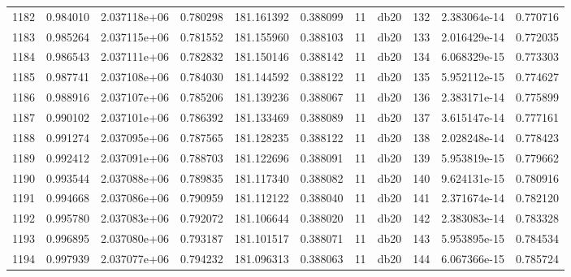 \begin{tabular}{lrrrrrrlrrr}
1182 &    0.984010 &        2.037118e+06 &  0.780298 &              181.161392 &    0.388099 &      11 &         db20 &    132 &   2.383064e-14 &      0.770716 \\
1183 &    0.985264 &        2.037115e+06 &  0.781552 &              181.155960 &    0.388103 &      11 &         db20 &    133 &   2.016429e-14 &      0.772035 \\
1184 &    0.986543 &        2.037111e+06 &  0.782832 &              181.150146 &    0.388142 &      11 &         db20 &    134 &   6.068329e-15 &      0.773303 \\
1185 &    0.987741 &        2.037108e+06 &  0.784030 &              181.144592 &    0.388122 &      11 &         db20 &    135 &   5.952112e-15 &      0.774627 \\
1186 &    0.988916 &        2.037107e+06 &  0.785206 &              181.139236 &    0.388067 &      11 &         db20 &    136 &   2.383171e-14 &      0.775899 \\
1187 &    0.990102 &        2.037101e+06 &  0.786392 &              181.133469 &    0.388089 &      11 &         db20 &    137 &   3.615147e-14 &      0.777161 \\
1188 &    0.991274 &        2.037095e+06 &  0.787565 &              181.128235 &    0.388122 &      11 &         db20 &    138 &   2.028248e-14 &      0.778423 \\
1189 &    0.992412 &        2.037091e+06 &  0.788703 &              181.122696 &    0.388091 &      11 &         db20 &    139 &   5.953819e-15 &      0.779662 \\
1190 &    0.993544 &        2.037088e+06 &  0.789835 &              181.117340 &    0.388082 &      11 &         db20 &    140 &   9.624131e-15 &      0.780916 \\
1191 &    0.994668 &        2.037086e+06 &  0.790959 &              181.112122 &    0.388040 &      11 &         db20 &    141 &   2.371674e-14 &      0.782120 \\
1192 &    0.995780 &        2.037083e+06 &  0.792072 &              181.106644 &    0.388020 &      11 &         db20 &    142 &   2.383083e-14 &      0.783328 \\
1193 &    0.996895 &        2.037080e+06 &  0.793187 &              181.101517 &    0.388071 &      11 &         db20 &    143 &   5.953895e-15 &      0.784534 \\
1194 &    0.997939 &        2.037077e+06 &  0.794232 &              181.096313 &    0.388063 &      11 &         db20 &    144 &   6.067366e-15 &      0.785724 \\

\end{tabular}
